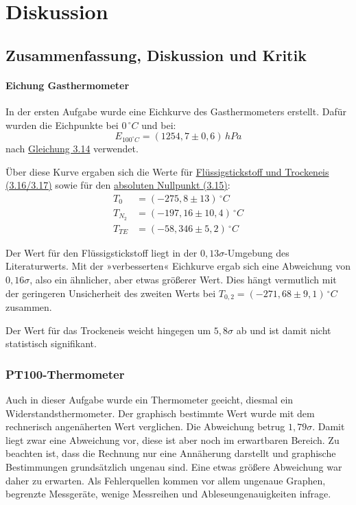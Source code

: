\chapter{Diskussion}

\section{Zusammenfassung, Diskussion und Kritik}

\subsubsection*{Eichung Gasthermometer}
In der ersten Aufgabe wurde eine Eichkurve des Gasthermometers erstellt. Dafür wurden die Eichpunkte bei $0 \, ^\circ C$ und bei:
\begin{equation}
    E_{100^\circ C} = (1254,7 \pm 0,6) \, hPa
\end{equation}
nach \hyperref[e:1]{Gleichung 3.14} verwendet.

Über diese Kurve ergaben sich die Werte für \hyperref[e:3]{Flüssigstickstoff und Trockeneis (3.16/3.17)} sowie für den \hyperref[e:2]{absoluten Nullpunkt (3.15)}:
\begin{align}
    T_0 &= (-275,8 \pm 13)  \, ^\circ C  \\
    T_{N_2} &= (-197,16 \pm 10,4) \, ^\circ C \\
    T_{TE} &= (-58,346 \pm 5,2) \, ^\circ C
\end{align}

Der Wert für den Flüssigstickstoff liegt in der $0,13\sigma$-Umgebung des Literaturwerts. Mit der »verbesserten« Eichkurve ergab sich eine Abweichung von 
$0,16\sigma$, also ein ähnlicher, aber etwas größerer Wert. Dies hängt vermutlich mit der geringeren Unsicherheit des zweiten Werts bei $T_{0,2} = (-271,68 \pm 9,1) \, ^\circ C$ zusammen.

Der Wert für das Trockeneis weicht hingegen um $5,8\sigma$ ab und ist damit nicht statistisch signifikant.

\subsection*{PT100-Thermometer}
Auch in dieser Aufgabe wurde ein Thermometer geeicht, diesmal ein Widerstandsthermometer. Der graphisch bestimmte Wert wurde mit dem rechnerisch angenäherten Wert verglichen. Die Abweichung betrug $1,79\sigma$. Damit liegt zwar eine Abweichung vor, diese ist aber noch im erwartbaren Bereich.
Zu beachten ist, dass die Rechnung nur eine Annäherung darstellt und graphische Bestimmungen grundsätzlich ungenau sind. Eine etwas größere Abweichung war daher zu erwarten. 
Als Fehlerquellen kommen vor allem ungenaue Graphen, begrenzte Messgeräte, wenige Messreihen und Ableseungenauigkeiten infrage.

